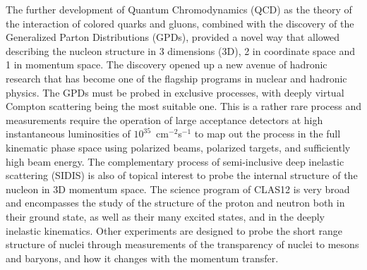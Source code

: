 \documentclass[final,3p,twocolumn]{elsarticle}
\begin{document}
The further development of Quantum Chromodynamics (QCD) as the theory of the interaction of colored quarks and
gluons, combined with the discovery of the Generalized Parton Distributions (GPDs), provided a novel way that allowed
describing the nucleon structure in 3 dimensions (3D), 2 in coordinate space and 1 in momentum space. The discovery
opened up a new avenue of hadronic research that has become one of the flagship programs in nuclear and hadronic
physics. The GPDs must be probed in exclusive processes, with deeply virtual Compton scattering being the most
suitable one. This is a rather rare process and measurements require the operation of large acceptance detectors 
at high instantaneous luminosities of $10^{35}$~cm$^{-2}$s$^{-1}$ to map out the process in the full kinematic phase
space using polarized beams, polarized targets, and sufficiently high beam energy. The complementary process of
semi-inclusive deep inelastic scattering (SIDIS) is also of topical interest to probe the internal structure of the
nucleon in 3D momentum space. The science program of CLAS12 is very broad~\cite{Burkert:2018nvj} and
encompasses the study of the structure of the proton and neutron both in their ground state, as well as their many
excited states, and in the deeply inelastic kinematics. Other experiments are designed to probe the short range
structure of nuclei through measurements of the transparency of nuclei to mesons and baryons, and how it changes
with the momentum transfer.   
\end{document}
